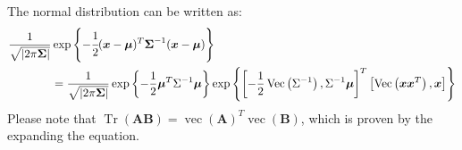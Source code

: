\begin{proposition}
    The normal distribution can be written as:
    \begin{equation*}
    \begin{aligned}
        \frac{1}{\sqrt{\left| 2\pi \boldsymbol \Sigma \right|}}&\exp\left\{ -\cfrac{1}{2}(\boldsymbol x-\boldsymbol \mu)^T\boldsymbol \Sigma^{-1}(\boldsymbol x-\boldsymbol \mu) \right\} \\
        &= \frac{1}{\sqrt{\left| 2\pi \boldsymbol \Sigma \right|}}\exp\left\{ -\frac{1}{2}\boldsymbol \mu^T\Sigma^{-1}\boldsymbol \mu \right\}\exp \left\{ \left[ -\frac{1}{2} \operatorname{Vec}\left(\Sigma^{-1}\right), \Sigma^{-1} \boldsymbol{\mu} \right]^{T}\left[\operatorname{Vec}\left(\boldsymbol{x} \boldsymbol{x}^{T}\right), \boldsymbol{x}\right] \right\}
    \end{aligned}
    \end{equation*}
    Please note that $\operatorname{Tr}(\boldsymbol A\boldsymbol B) = \operatorname{vec}(\boldsymbol A)^T\operatorname{vec}(\boldsymbol B)$, which is proven by the expanding the equation. 
\end{proposition}

